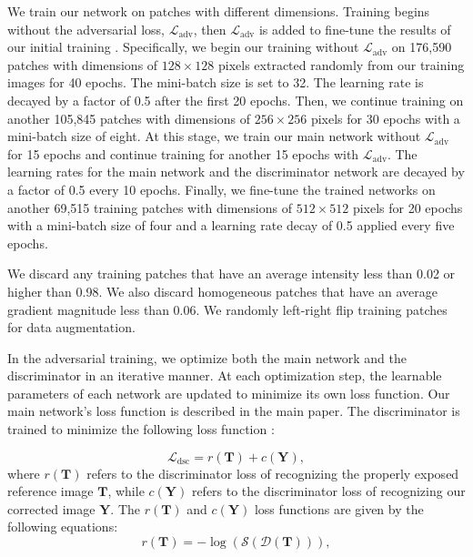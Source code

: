 \documentclass[final]{cvpr}
\begin{document}
We train our network on patches with different dimensions. Training begins without the adversarial loss, $\mathcal{L}_{\text{adv}}$, then $\mathcal{L}_{\text{adv}}$ is added to fine-tune the results of our initial training \cite{ma2017pose}. Specifically, we begin our training without $\mathcal{L}_{\text{adv}}$ on 176,590 patches with dimensions of $128\!\times\!128$ pixels extracted randomly from our training images for 40 epochs. The mini-batch size is set to 32. The learning rate is decayed by a factor of 0.5 after the first 20 epochs. Then, we continue training on another 105,845 patches with dimensions of $256\!\times\!256$ pixels for 30 epochs with a mini-batch size of eight. At this stage, we train our main network without $\mathcal{L}_{\text{adv}}$ for 15 epochs and continue training for another 15 epochs with $\mathcal{L}_{\text{adv}}$. The learning rates for the main network and the discriminator network are decayed by a factor of 0.5 every 10 epochs. Finally, we fine-tune the trained networks on another 69,515 training patches with dimensions of $512\!\times\!512$ pixels for 20 epochs with a mini-batch size of four and a learning rate decay of 0.5 applied every five epochs.

We discard any training patches that have an average intensity less than 0.02 or higher than 0.98. We also discard homogeneous patches that have an average gradient magnitude less than 0.06. We randomly left-right flip training patches for data augmentation.

In the adversarial training, we optimize both the main network and the discriminator in an iterative manner. At each optimization step, the learnable parameters of each network are updated to minimize its own loss function. Our main network's loss function is described in the main paper. The discriminator is trained to minimize the following loss function \cite{goodfellow2014generative}:

\begin{equation}
\label{eq:dsc_loss}
\mathcal{L}_{\text{dsc}} = r\left(\mathbf{T}\right) + c\left(\mathbf{Y}\right),
\end{equation}
where $r\left(\mathbf{T}\right)$ refers to the discriminator loss of recognizing the properly exposed reference image $\mathbf{T}$, while $c\left(\mathbf{Y}\right)$ refers to the discriminator loss of recognizing our corrected image $\mathbf{Y}$. The $r\left(\mathbf{T}\right)$ and $c\left(\mathbf{Y}\right)$ loss functions are given by the following equations: 
\begin{equation}
\label{eq:r_loss}
r\left(\mathbf{T}\right) =
-\log\left(\mathcal{S}\left(\mathcal{D}\left(\mathbf{T}\right)\right)\right), 
\end{equation}
\end{document}
